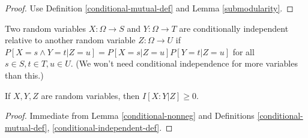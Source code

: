 \begin{proof}  Use Definition \ref{conditional-mutual-def} and Lemma \ref{submodularity}.
\end{proof}

\begin{definition}\label{conditional-independent-def}
  Two random variables $X: \Omega \to S$ and $Y: \Omega \to T$ are conditionally independent relative to another random variable $Z: \Omega \to U$ if $P[ X = s \wedge Y = t| Z=u] = P[X=s|Z=u] P[Y=t|Z=u]$ for all $s \in S, t \in T, u \in U$.  (We won't need conditional independence for more variables than this.)
\end{definition}

\begin{lemma}\label{conditional-vanish}  
  If $X,Y,Z$ are random variables, then $I[X:Y|Z] \ge 0$.
\end{lemma}

\begin{proof}  Immediate from Lemma \ref{conditional-nonneg} and Definitions \ref{conditional-mutual-def}, \ref{conditional-independent-def}.
\end{proof}
